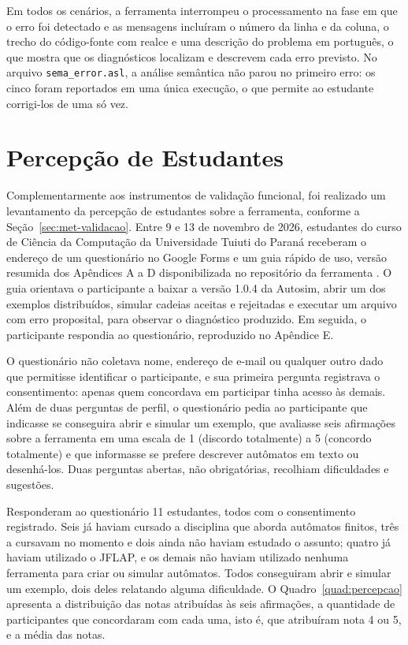 \documentclass[
    12pt
    ,oneside
    ,a4paper
    ,chapter=TITLE
    ,section=TITLE
    ,sumario=abnt-6027-2012]{abntex2}
\begin{document}
Em todos os cenários, a ferramenta interrompeu o processamento na fase em que o erro foi
detectado e as mensagens incluíram o número da linha e da coluna, o trecho do código-fonte
com realce e uma descrição do problema em português, o que mostra que os diagnósticos
localizam e descrevem cada erro previsto. No arquivo \texttt{sema\_error.asl}, a análise
semântica não parou no primeiro erro: os cinco foram reportados em uma única execução, o que
permite ao estudante corrigi-los de uma só vez.

\section{Percepção de Estudantes}
\label{sec:res-percepcao}

Complementarmente aos instrumentos de validação funcional, foi realizado um levantamento da
percepção de estudantes sobre a ferramenta, conforme a Seção~\ref{sec:met-validacao}. Entre 9
e 13 de novembro de 2026, estudantes do curso de Ciência da Computação da Universidade Tuiuti
do Paraná receberam o endereço de um questionário no Google Forms e um guia rápido de uso, versão resumida dos Apêndices A a D disponibilizada no repositório da ferramenta
\cite{autosim2026}. O guia orientava o participante a baixar a versão 1.0.4 da Autosim, abrir
um dos exemplos distribuídos, simular cadeias aceitas e rejeitadas e executar um arquivo com
erro proposital, para observar o diagnóstico produzido. Em seguida, o participante respondia
ao questionário, reproduzido no Apêndice E.

O questionário não coletava nome, endereço de e-mail ou qualquer outro dado que permitisse
identificar o participante, e sua primeira pergunta registrava o consentimento: apenas quem
concordava em participar tinha acesso às demais. Além de duas perguntas de perfil, o
questionário pedia ao participante que indicasse se conseguira abrir e simular um exemplo,
que avaliasse seis afirmações sobre a ferramenta em uma escala de 1 (discordo totalmente) a 5
(concordo totalmente) e que informasse se prefere descrever autômatos em texto ou desenhá-los.
Duas perguntas abertas, não obrigatórias, recolhiam dificuldades e sugestões.

Responderam ao questionário 11 estudantes, todos com o consentimento registrado. Seis já
haviam cursado a disciplina que aborda autômatos finitos, três a cursavam no momento e dois
ainda não haviam estudado o assunto; quatro já haviam utilizado o JFLAP, e os demais não
haviam utilizado nenhuma ferramenta para criar ou simular autômatos. Todos conseguiram abrir
e simular um exemplo, dois deles relatando alguma dificuldade. O Quadro~\ref{quad:percepcao}
apresenta a distribuição das notas atribuídas às seis afirmações, a quantidade de
participantes que concordaram com cada uma, isto é, que atribuíram nota 4 ou 5, e a média
das notas.
\end{document}
